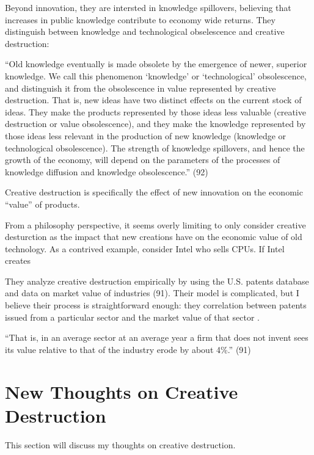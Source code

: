 \documentclass[11pt]{article}
\begin{document}
Beyond innovation, they are intersted in knowledge spillovers, believing that increases in public knowledge contribute to economy wide returns.
They distinguish between knowledge and technological obselescence and creative destruction:
\begin{displayquote}
``Old knowledge eventually is made obsolete by the emergence of newer, superior knowledge. We call this phenomenon `knowledge' or `technological' obsolescence, and distinguish it from the obsolescence in value represented by creative destruction.
That is, new ideas have two distinct effects on the current stock of ideas. 
They make the products represented by those ideas less valuable (creative destruction or value obsolescence), and they make the knowledge represented by those ideas less relevant in the production of new knowledge (knowledge or technological obsolescence). 
The strength of knowledge spillovers, and hence the growth of the economy, will depend on the parameters of the processes of knowledge diffusion and knowledge obsolescence.'' (92)
\end{displayquote}
Creative destruction is specifically the effect of new innovation on the economic ``value'' of products.

From a philosophy perspective, it seems overly limiting to only consider creative desturction as the impact that new creations have on the economic value of old technology.
As a contrived example, consider Intel who sells CPUs. 
If Intel creates 







\newpage
They analyze creative destruction empirically by using the U.S. patents database and data on market value of industries (91).
Their model is complicated, but I believe their process is straightforward enough: they correlation between patents issued from a particular sector and the market value of that sector . 
\begin{displayquote}
    ``That is, in an average sector at an average year a firm that does not invent sees its value relative to that of the industry erode by about 4\%.'' (91)
\end{displayquote}


\newpage
\section{New Thoughts on Creative Destruction}
This section will discuss my thoughts on creative destruction.
\end{document}

